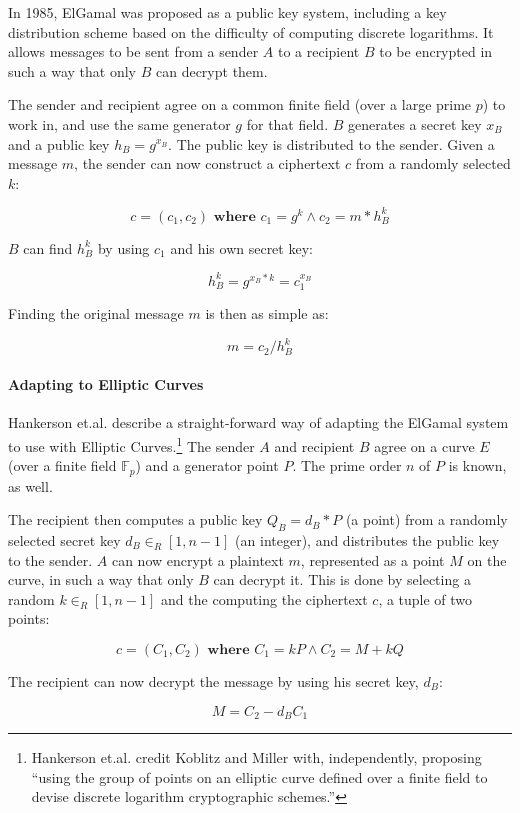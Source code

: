\label{sec:math_encryption_elgamal}

In 1985, ElGamal was proposed as a public key system, including a key distribution scheme based
on the difficulty of computing discrete logarithms. It allows messages to be sent from a sender
\(A\) to a recipient \(B\) to be encrypted in such a way that only \(B\) can decrypt them.

The sender and recipient agree on a common finite field (over a large prime \(p\)) to work in,
and use the same generator \(g\) for that field. \(B\) generates a secret key \(x_B\) and a public
key \(h_B = g^{x_B}\). The public key is distributed to the sender. Given a message \(m\), the
sender can now construct a ciphertext \(c\) from a randomly selected \(k\):\cite{elgamal}

\begin{equation}
	c = (c_1, c_2)  \textbf{ where }  c_1 = g^k \land c_2 = m * h_B^k
\end{equation}

\(B\) can find \(h_B^k\) by using \(c_1\) and his own secret key:

\begin{equation}
	h_B^k = g^{x_B*k} = c_1^{x_B}
\end{equation}

Finding the original message \(m\) is then as simple as:

\begin{equation}
    m = c_2/h_B^k
\end{equation}

\paragraph{Adapting to Elliptic Curves}
Hankerson et.al. describe a straight-forward way of adapting the ElGamal system to use with
Elliptic Curves.\footnote{Hankerson et.al. credit Koblitz and Miller with, independently, proposing
``using the group of points on an elliptic curve defined over a finite field to devise discrete
logarithm cryptographic schemes.''\cite{hankerson2010}} The sender \(A\) and recipient \(B\) agree on a curve \(E\)
(over a finite field \(\mathbb{F}_p\)) and a generator point \(P\). The prime order \(n\) of \(P\) is
known, as well.\cite{hankerson2010}

The recipient then computes a public key \(Q_B = d_B * P\) (a point) from a randomly selected secret key
\(d_B \in_R [1,n-1]\) (an integer), and distributes the public key to the sender. \(A\) can now encrypt
a plaintext \(m\), represented as a point \(M\) on the curve, in such a way that only \(B\) can decrypt
it. This is done by selecting a random \(k \in_R [1,n-1]\) and the computing the ciphertext \(c\), a
tuple of two points:

\begin{equation}
	c = (C_1, C_2)  \textbf{ where }  C_1 = kP \land C_2 = M+kQ
\end{equation}

The recipient can now decrypt the message by using his secret key, \(d_B\):

\begin{equation}
	M = C_2 - d_B C_1
\end{equation}